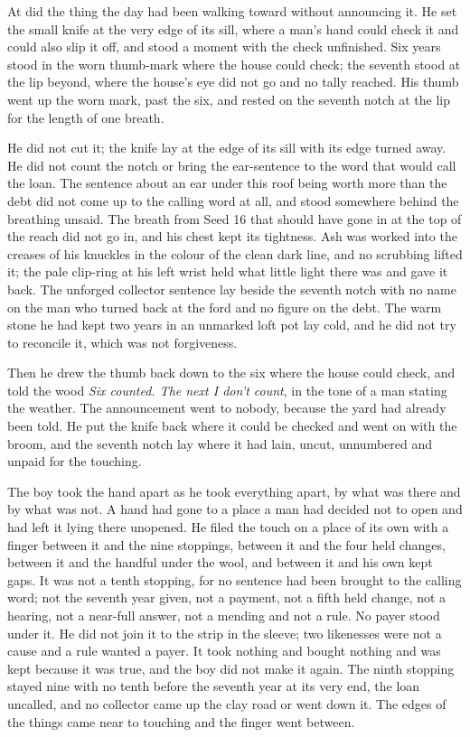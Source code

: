 \scenebreak

At   did the thing the day had been walking toward without announcing it. He set the small knife at the very edge of its sill, where a man's hand could check it and could also slip it off, and stood a moment with the check unfinished. Six years stood in the worn thumb-mark where the house could check; the seventh stood at the lip beyond, where the house's eye did not go and no tally reached. His thumb went up the worn mark, past the six, and rested on the seventh notch at the lip for the length of one breath.

He did not cut it; the knife lay at the edge of its sill with its edge turned away. He did not count the notch or bring the ear-sentence to the word that would call the loan. The sentence about an ear under this roof being worth more than the debt did not come up to the calling word at all, and stood somewhere behind the breathing unsaid. The breath from Seed 16 that should have gone in at the top of the reach did not go in, and his chest kept its tightness. Ash was worked into the creases of his knuckles in the colour of the clean dark line, and no scrubbing lifted it; the pale clip-ring at his left wrist held what little light there was and gave it back. The unforged collector sentence lay beside the seventh notch with no name on the man who turned back at the ford and no figure on the debt. The warm stone he had kept two years in an unmarked loft pot lay cold, and he did not try to reconcile it, which was not forgiveness.

Then he drew the thumb back down to the six where the house could check, and told the wood \emph{Six counted. The next I don't count}, in the tone of a man stating the weather. The announcement went to nobody, because the yard had already been told. He put the knife back where it could be checked and went on with the broom, and the seventh notch lay where it had lain, uncut, unnumbered and unpaid for the touching.

The boy took the hand apart as he took everything apart, by what was there and by what was not. A hand had gone to a place a man had decided not to open and had left it lying there unopened. He filed the touch on a place of its own with a finger between it and the nine stoppings, between it and the four held changes, between it and the handful under the wool, and between it and his own kept gaps. It was not a tenth stopping, for no sentence had been brought to the calling word; not the seventh year given, not a payment, not a fifth held change, not a hearing, not a near-full answer, not a mending and not a rule. No payer stood under it. He did not join it to the strip in the sleeve; two likenesses were not a cause and a rule wanted a payer. It took nothing and bought nothing and was kept because it was true, and the boy did not make it again. The ninth stopping stayed nine with no tenth before the seventh year at its very end, the loan uncalled, and no collector came up the clay road or went down it. The edges of the things came near to touching and the finger went between.

